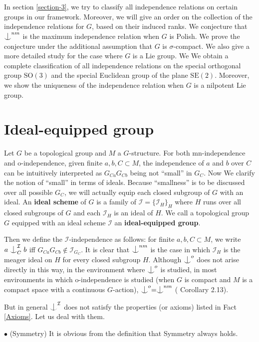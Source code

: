 \documentclass{article}
\newcommand{\I}{\mathcal{I}}
\newcommand{\SO}{\mathrm{SO}}
\newcommand{\ind}{\mathrel{\raise0.2ex\hbox{\ooalign{\hidewidth$\vert$\hidewidth\cr\raise-0.9ex\hbox{$\smile$}}}}}
\begin{document}
In section \ref{section-3}, we  try to classify all independence relations on certain groups in our framework. Moreover, we will give an order on the collection of the independence relations for $G$, based on their induced ranks. We conjecture that $\ind^{nm}$ is the maximum independence relation when $G$ is Polish. We prove the conjecture under the additional assumption that $G$ is $\sigma$-compact. We also give a more detailed study for the case where $G$ is a Lie group. We We obtain a complete classification of all independence relations on the special orthogonal group $\SO(3)$ and the special Euclidean group of the plane $\mathrm{SE}(2)$. Moreover, we show the uniqueness of the independence relation when $G$ is a nilpotent Lie group.



\section{Ideal-equipped group}\label{section-1}

Let $G$ be a topological group and $M$ a $G$-structure. For both mn-independence and o-independence, given finite $a,b,C\subset M$, the independence of $a$ and $b$ over $C$ can be intuitively interpreted as $G_{Ca} G_{Cb}$ being not ``small'' in $G_C$. Now  We  clarify the notion of ``small'' in terms of ideals.
Because ``smallness'' is to be discussed over all possible $G_C$, we will actually equip each closed subgroup of $G$ with an ideal. 
An \textbf{ideal scheme} of $G$ is a family of $\I=\{\I_H\}_H$ where $H$ runs over all closed subgroups of $G$ and each $\I_H$ is an ideal of $H$. We call a topological group $G$ equipped with an ideal scheme $\I$ an \textbf{ideal-equipped group}.

Then we define the $\I$-independence as follows:  for finite $a,b, C\subset M$, we write $a\ind^\I_C b$  iff $G_{Ca} G_{Cb}\notin \I_{G_C}$.
It is clear that $\ind^{nm}$ is the case in which $\I_H$ is the meager ideal on $H$ for every closed subgroup $H$. Although $\ind^o$ does not arise directly in this way, in the environment where $\ind^o$ is studied, in most environments  in which o-independence is studied (when $G$ is compact and 
$M$ is a compact space with a continuous 
$G$-action), $\ind^o=\ind^{nm}$ (\cite{KP} Corollary 2.13).

But in general $\ind^\I$ does not satisfy the properties (or axioms) listed in Fact \ref{Axioms}. 
Let us deal with them.

$\bullet$ (Symmetry)
It is obvious from the definition that Symmetry always holds. 
\end{document}
